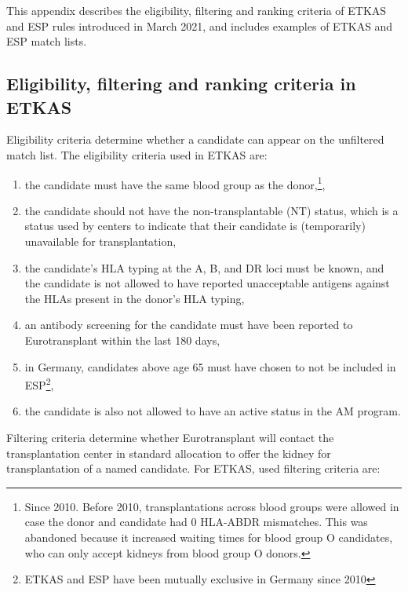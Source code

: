 This appendix describes the eligibility, filtering and ranking criteria of ETKAS and ESP rules introduced in March 2021, and includes examples of ETKAS and ESP match lists.

\FloatBarrier
\subsection{Eligibility, filtering and ranking criteria in ETKAS}
\label{subsection:criteria_etkas}
Eligibility criteria determine whether a candidate can appear on the unfiltered match list. The eligibility criteria used in ETKAS are:
\begin{enumerate}[noitemsep]
	\item the candidate must have the same blood group as the donor,\footnote{Since 2010. Before 2010, transplantations across blood groups were allowed in case the donor and candidate had 0 HLA-ABDR mismatches. This was abandoned because it increased waiting times for blood group O candidates, who can only accept kidneys from blood group O donors.},
	\item the candidate should not have the non-transplantable (NT) status, which is a status used by centers to indicate that their candidate is (temporarily) unavailable for transplantation,
	\item the candidate's HLA typing at the A, B, and DR loci must be known, and the candidate is not allowed to have reported unacceptable antigens against the HLAs present in the donor's HLA typing,
	\item an antibody screening for the candidate must have been reported to Eurotransplant within the last 180 days,
	\item in Germany, candidates above age 65 must have chosen to not be included in ESP\footnote{ETKAS and ESP have been mutually exclusive in Germany since 2010},
	\item the candidate is also not allowed to have an active status in the AM program.
\end{enumerate}
Filtering criteria determine whether Eurotransplant will contact the transplantation center in standard allocation to offer the kidney for transplantation of a named candidate. For ETKAS, used filtering criteria are:
